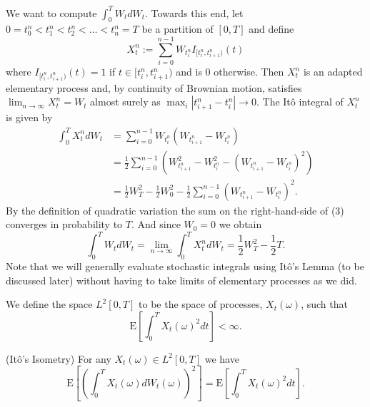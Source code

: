 \begin{example}
We want to compute $\int_0^T W_t dW_t$. Towards this end, let $0=t_0^n<t_1^n<t_2^n<\ldots<t_n^n=T$ be a partition of $[0,T]$ and define
\[X_t^n := \sum_{i=0}^{n-1} W_{t_i^n} I_{[t_i^n,t_{i+1}^n)}(t)\]
where $I_{[t_i^n,t_{i+1}^n)}(t)=1$ if $t\in[t_i^n,t_{i+1}^n)$ and is $0$ otherwise. Then $X_t^n$ is an adapted elementary process and, by continuity of Brownian motion, satisfies $\lim_{n\rightarrow\infty}X_t^n=W_t$ almost surely as $\max_i|t_{i+1}^n-t_i^n|\to 0$. The It\^o integral of $X_t^n$ is given by
\begin{align*}
\int_0^T X_t^n dW_t &= \sum_{i=0}^{n-1} W_{t_i^n}(W_{t_{i+1}^n}-W_{t_i^n}) \\
&= \frac{1}{2}\sum_{i=0}^{n-1} \left(W_{t_{i+1}^n}^2 - W_{t_i^n}^2 - (W_{t_{i+1}^n}-W_{t_i^n})^2\right) \\
&= \frac{1}{2}W_T^2 - \frac{1}{2}W_0^2 - \frac{1}{2}\sum_{i=0}^{n-1} (W_{t_{i+1}^n}-W_{t_i^n})^2.\tag{3}
\end{align*}
By the definition of quadratic variation the sum on the right-hand-side of (3) converges in probability to $T$. And since $W_0=0$ we obtain
\[\int_0^T W_t dW_t = \lim_{n\rightarrow\infty} \int_0^T X_t^n dW_t = \frac{1}{2}W_T^2 - \frac{1}{2}T.\]
Note that we will generally evaluate stochastic integrals using It\^o's Lemma (to be discussed later) without having to take limits of elementary processes as we did.
\end{example}

\begin{definition}
We define the space $L^2[0,T]$ to be the space of processes, $X_t(\omega)$, such that
\[\mathrm{E}\left[\int_0^T X_t(\omega)^2 dt\right]<\infty.\]
\end{definition}

\begin{theorem} (It\^o's Isometry)
For any $X_t(\omega)\in L^2[0,T]$ we have
\[\mathrm{E}\left[\left(\int_0^T X_t(\omega) dW_t(\omega)\right)^2\right] = \mathrm{E}\left[\int_0^T X_t(\omega)^2 dt\right].\]
\end{theorem}


